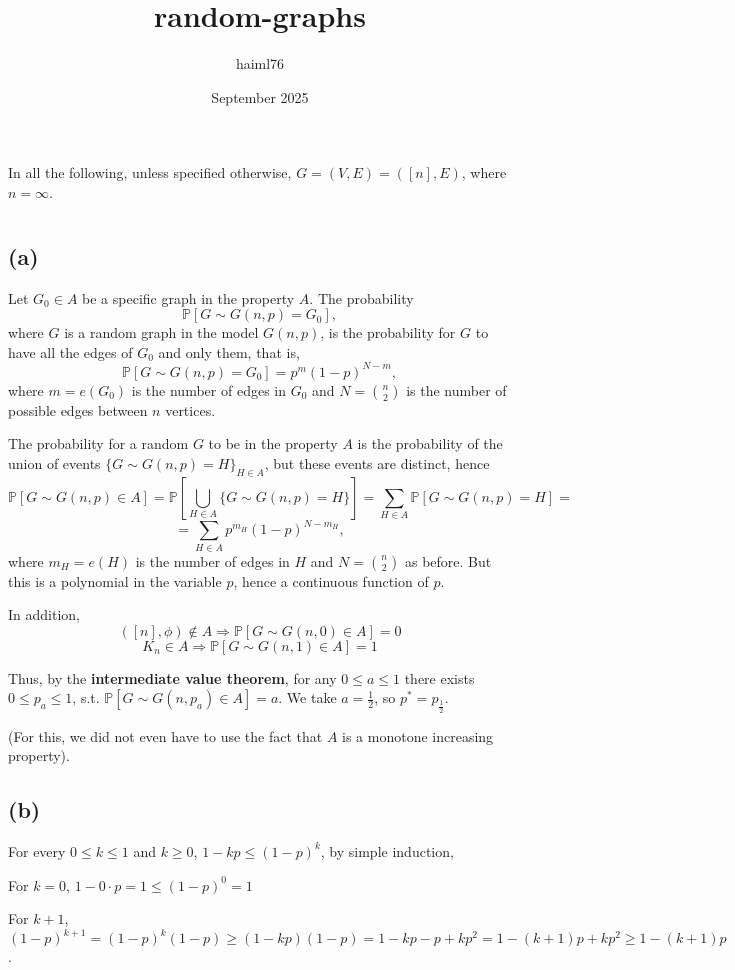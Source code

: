 \documentclass{article}
\title{random-graphs}
\author{haiml76 }
\date{September 2025}
\begin{document}
\maketitle

In all the following, unless specified otherwise, $G=(V,E)=([n],E)$, where $n=\infty$.
\section{}
\subsection*{(a)}
Let $G_0\in{A}$ be a specific graph in the property $A$. The probability \[\mathbb{P}[G\sim{G(n,p)}=G_0],\]
where $G$ is a random graph in the model $G(n,p)$, is the probability for $G$ to have all the edges of $G_0$ and only them, that is,
\[\mathbb{P}[G\sim{G(n,p)}=G_0]=p^m(1-p)^{N-m},\]
where $m=e(G_0)$ is the number of edges in $G_0$ and $N=\binom{n}{2}$ is the number of possible edges between $n$ vertices.

The probability for a random $G$ to be in the property $A$ is the probability of the union of events $\{G\sim{G(n,p)}=H\}_{H\in{A}}$, but these events are distinct, hence \[\mathbb{P}[G\sim{G(n,p)}\in{A}]=\mathbb{P}[\bigcup_{H\in{A}}\{G\sim{G(n,p)}=H\}]=\sum_{H\in{A}}\mathbb{P}[G\sim{G(n,p)}=H]=\]\[=\sum_{H\in{A}}p^{m_H}(1-p)^{N-m_H},\]
where $m_H=e(H)$ is the number of edges in $H$ and $N=\binom{n}{2}$ as before. But this is a polynomial in the variable $p$, hence a continuous function of $p$. 

In addition,
\[([n],\phi)\notin{A}\Rightarrow\mathbb{P}[G\sim{G(n,0)}\in{A}]=0\]\[K_n\in{A}\Rightarrow\mathbb{P}[G\sim{G(n,1)}\in{A}]=1\]

Thus, by the \textbf{intermediate value theorem}, for any $0\leq{a}\leq{1}$ there exists $0\leq{p_a}\leq{1}$, s.t. $\mathbb{P}[G\sim{G(n,p_a)}\in{A}]=a$. We take $a=\frac{1}{2}$, so $p^\ast=p_\frac{1}{2}$.

(For this, we did not even have to use the fact that $A$ is a monotone increasing property).
\subsection*{(b)}
For every $0\leq{k}\leq{1}$ and $k\geq{0}$, $1-kp\leq(1-p)^k$, by simple induction,

For $k=0$, $1-0\cdot{p}=1\leq{(1-p)^0}=1$

For $k+1$, $(1-p)^{k+1}=(1-p)^k(1-p)\geq(1-kp)(1-p)=1-kp-p+kp^2=1-(k+1)p+kp^2\geq{1-(k+1)p}$.
\end{document}
